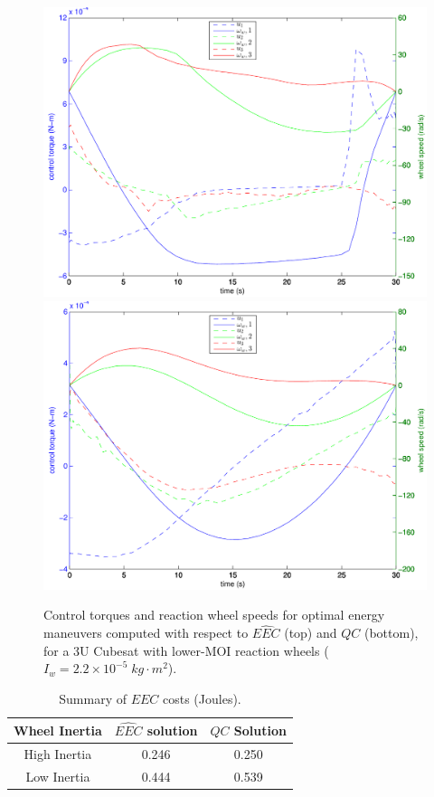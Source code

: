 \documentclass[letterpaper, paper,11pt]{AAS}
\begin{document}
\begin{figure}[h!]
\centering
\includegraphics[width = 5.1 in]{figures/3u_master_50N_soln_BC_controls_and_wheel_speeds_cropped.pdf}
\includegraphics[width = 5.1 in]{figures/3u_u2_50N_soln_BC_controls_and_wheel_speeds_cropped.pdf}
\centering
\caption{Control torques and reaction wheel speeds for optimal energy maneuvers computed with respect to $\hat{EEC}$ (top) and $QC$ (bottom), for a 3U Cubesat with lower-MOI reaction wheels ($I_w = 2.2 \times 10^{-5}\; kg \cdot m^2$).}
\label{f:SWT}
\end{figure}

\begin{table}[h!]
	\fontsize{10}{10}\selectfont
        \centering 
   \begin{tabular}{c | c | c} %
      \hline 
      Wheel Inertia    & $\hat{EEC}$ solution & $QC$ Solution   \\
      \hline 
      High Inertia      & 0.246 & 0.250  \\
      Low Inertia       & 0.444 & 0.539 \\ 
      \hline
   \end{tabular}
   	       \caption{Summary of $EEC$ costs (Joules).}
	   \label{tab:EECC}
\end{table}
\end{document}
